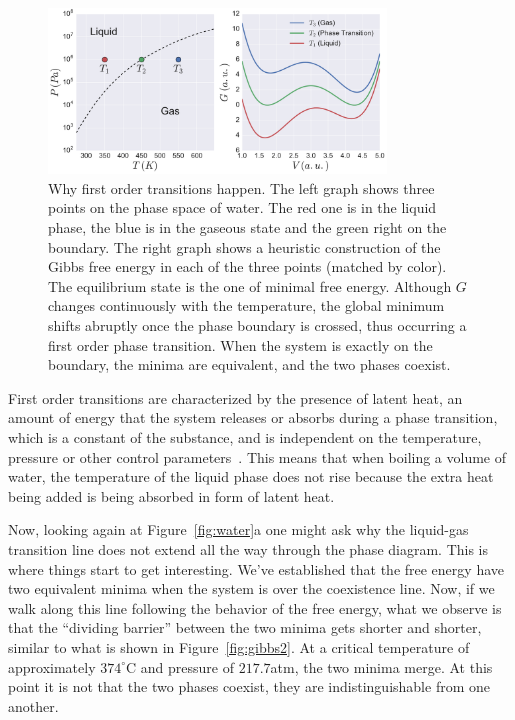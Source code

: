 \begin{figure}[t]
\begin{center}
    \includegraphics[width=0.8\textwidth]{chapters/ch2-crit/figs/gibbs1}
\end{center}
\caption{Why first order transitions happen. The left graph shows three points
    on the phase space of water. The red one is in the liquid phase, the blue
    is in the gaseous state and the green right on the boundary. The right
    graph shows a heuristic construction of the Gibbs free energy in each of
    the three points (matched by color). The equilibrium state is the one of
    minimal free energy. Although $G$ changes continuously with the
    temperature, the global minimum shifts abruptly once the phase boundary is
    crossed, thus occurring a first order phase transition. When the system is
    exactly on the boundary, the minima are equivalent, and the two phases
    coexist.}
\label{fig:gibbs1}
\end{figure}


First order transitions are characterized by the presence of latent heat, an
amount of energy that the system releases or absorbs during a phase transition,
which is a constant of the substance, and is independent on the temperature,
pressure or other control parameters~\cite{Callen1985}. This means that when
boiling a volume of water, the temperature of the liquid phase does not rise
because the extra heat being added is being absorbed in form of latent heat.

Now, looking again at Figure~\ref{fig:water}a one might ask why the liquid-gas
transition line does not extend all the way through the phase diagram. This
is where things start to get interesting. We've established that the free
energy have two equivalent minima when the system is over the coexistence line.
Now, if we walk along this line following the behavior of the free energy, what
we observe is that the ``dividing barrier'' between  the two minima gets shorter
and shorter, similar to what is shown in Figure~\ref{fig:gibbs2}. At a critical
temperature of approximately $374^\circ$C and pressure of $217.7$atm, the two
minima merge. At this point it is not that the two phases coexist, they are
indistinguishable from one another.

